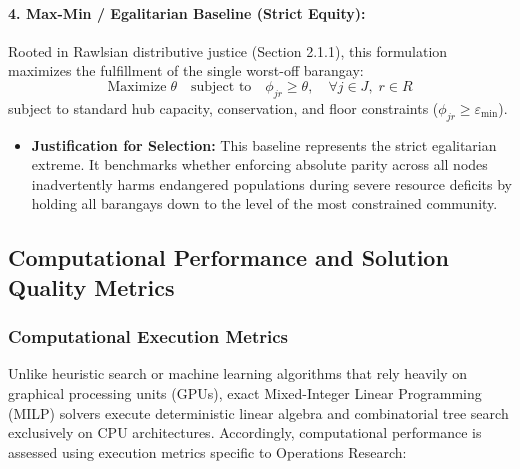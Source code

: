 \paragraph{4. Max-Min / Egalitarian Baseline (Strict Equity):}
Rooted in Rawlsian distributive justice (Section 2.1.1), this formulation maximizes the fulfillment of the single worst-off barangay:
\begin{equation}
    \text{Maximize} \; \theta \quad \text{subject to} \quad \phi_{jr} \ge \theta, \quad \forall j \in J, \; r \in R
\end{equation}
subject to standard hub capacity, conservation, and floor constraints ($\phi_{jr} \ge \varepsilon_{\min}$).
\begin{itemize}
    \item \textbf{Justification for Selection:} This baseline represents the strict egalitarian extreme. It benchmarks whether enforcing absolute parity across all nodes inadvertently harms endangered populations during severe resource deficits by holding all barangays down to the level of the most constrained community.
\end{itemize}

\subsection{Computational Performance and Solution Quality Metrics}
\label{sec:performance_metrics}

\subsubsection{Computational Execution Metrics}
Unlike heuristic search or machine learning algorithms that rely heavily on graphical processing units (GPUs), exact Mixed-Integer Linear Programming (MILP) solvers execute deterministic linear algebra and combinatorial tree search exclusively on CPU architectures. Accordingly, computational performance is assessed using execution metrics specific to Operations Research:

